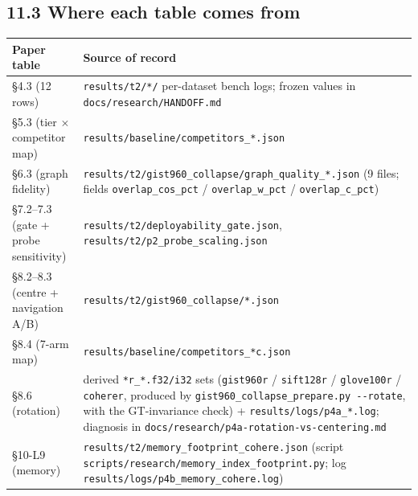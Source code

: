 \documentclass[
  10pt,
]{article}
\newcounter{none} %
\begin{document}
\subsection{11.3 Where each table comes
from}\label{where-each-table-comes-from}

{\def\LTcaptype{none} %
\begin{longtable}[]{@{}
  >{\raggedright\arraybackslash}p{}
  >{\raggedright\arraybackslash}p{}@{}}
\toprule\noalign{}
\begin{minipage}[b]{\linewidth}\raggedright
Paper table
\end{minipage} & \begin{minipage}[b]{\linewidth}\raggedright
Source of record
\end{minipage} \\
\midrule\noalign{}
\endhead
\bottomrule\noalign{}
\endlastfoot
§4.3 (12 rows) & \texttt{results/t2/*/} per-dataset bench logs; frozen
values in \texttt{docs/research/HANDOFF.md} \\
§5.3 (tier $\times$ competitor map) &
\texttt{results/baseline/competitors\_*.json} \\
§6.3 (graph fidelity) &
\texttt{results/t2/gist960\_collapse/graph\_quality\_*.json} (9 files;
fields \texttt{overlap\_cos\_pct} / \texttt{overlap\_w\_pct} /
\texttt{overlap\_c\_pct}) \\
§7.2--7.3 (gate + probe sensitivity) &
\texttt{results/t2/deployability\_gate.json},
\texttt{results/t2/p2\_probe\_scaling.json} \\
§8.2--8.3 (centre + navigation A/B) &
\texttt{results/t2/gist960\_collapse/*.json} \\
§8.4 (7-arm map) & \texttt{results/baseline/competitors\_*c.json} \\
§8.6 (rotation) & derived \texttt{*r\_*.f32/i32} sets (\texttt{gist960r}
/ \texttt{sift128r} / \texttt{glove100r} / \texttt{coherer}, produced by
\texttt{gist960\_collapse\_prepare.py\ -\/-rotate}, with the
GT-invariance check) + \texttt{results/logs/p4a\_*.log}; diagnosis in
\texttt{docs/research/p4a-rotation-vs-centering.md} \\
§10-L9 (memory) & \texttt{results/t2/memory\_footprint\_cohere.json}
(script \texttt{scripts/research/memory\_index\_footprint.py}; log
\texttt{results/logs/p4b\_memory\_cohere.log}) \\
\end{longtable}
}
\end{document}
